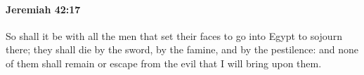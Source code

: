 
		\paragraph{Jeremiah 42:17} %
			\label{JEREMIAH-42-17}

			So shall it be with all the men that set their faces to go into Egypt to sojourn there; they shall die by the sword, by the famine, and by the pestilence: and none of them shall remain or escape from the evil that I will bring upon them.


